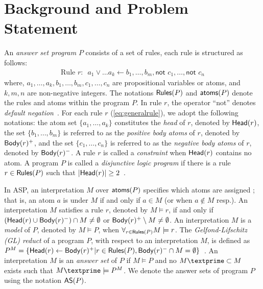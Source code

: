 \section{Background and Problem Statement}
An \textit{answer set program} $P$ consists of a set of rules, each rule is structured as follows:
\begin{align}
\label{eq:generalrule}
\text{Rule $r$:~~}a_1 \vee \ldots a_k \leftarrow b_1, \ldots, b_m, \textsf{not } c_1, \ldots, \textsf{not } c_n
\end{align}
where, $a_1, \ldots, a_k, b_1, \ldots, b_m, c_1, \ldots, c_n$ are propositional variables or atoms, and $k,m,n$ are non-negative integers. 
The notations $\mathsf{Rules}(P)$ and $\mathsf{atoms}(P)$ denote the rules and atoms within the program $P$. 
In rule $r$, the operator ``\textsf{not}'' denotes \textit{default negation}~\cite{clark1978}. For each 
rule $r$ (\cref{eq:generalrule}), we adopt the following notations: the atom set $\{a_1, \ldots, a_k\}$ constitutes the {\em head} of $r$, denoted by $\mathsf{Head}(r)$, the set $\{b_1, \ldots, b_m\}$ is referred to as the {\em positive body atoms} of $r$, denoted by $\mathsf{Body}(r)^+$, and the set $\{c_1, \ldots, c_n\}$ is referred to as the \textit{negative body atoms} of $r$, denoted by $\mathsf{Body}(r)^-$.
A rule $r$ is called a {\em constraint} when $\mathsf{Head}(r)$ contains no atom.
A program $P$ is called a {\em disjunctive logic program} if there is a rule $r \in \mathsf{Rules}(P)$ such that $|\mathsf{Head}(r)| \geq 2$~\cite{BD1994}.

In ASP, an interpretation $M$ over $\mathsf{atoms}(P)$ specifies which atoms are assigned \true; that is, an atom $a$ is \true under $M$ if and only if $a \in M$ (or \false when $a \not\in M$ resp.). 
%
An interpretation $M$ satisfies a rule $r$, denoted by $M \models r$, if and only if $(\mathsf{Head}(r) \cup \mathsf{Body}(r)^{-}) \cap M \neq \emptyset$ or $\mathsf{Body}(r)^{+} \setminus M \neq \emptyset$. An interpretation $M$ is a {\em model} of $P$, denoted by $M \models P$, when $\forall_{r \in \mathsf{Rules}(P)} M \models r$. 
%
The \textit{Gelfond-Lifschitz (GL) reduct} of a program $P$, with respect to an interpretation $M$, is defined as $P^M = \{\mathsf{Head}(r) \leftarrow \mathsf{Body}(r)^+| r \in \mathsf{Rules}(P), \mathsf{Body}(r)^- \cap M = \emptyset\}$~\cite{GL1991}.
%
An interpretation $M$ is an {\em answer set} of $P$ if $M \models P$ and no $M\textprime \subset M$ exists such that $M\textprime \models P^M$.
%
We denote the answer sets of program $P$ using the notation $\mathsf{AS}(P)$.

